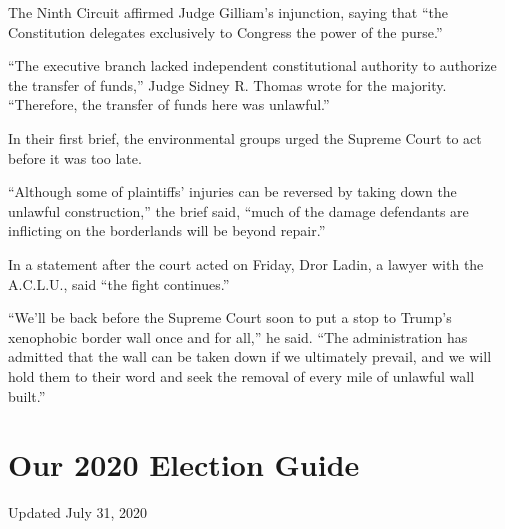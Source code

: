 The Ninth Circuit affirmed Judge Gilliam's injunction, saying that ``the
Constitution delegates exclusively to Congress the power of the purse.''

``The executive branch lacked independent constitutional authority to
authorize the transfer of funds,'' Judge Sidney R. Thomas wrote for the
majority. ``Therefore, the transfer of funds here was unlawful.''

In their first brief, the environmental groups urged the Supreme Court
to act before it was too late.

``Although some of plaintiffs' injuries can be reversed by taking down
the unlawful construction,'' the brief said, ``much of the damage
defendants are inflicting on the borderlands will be beyond repair.''

In a statement after the court acted on Friday, Dror Ladin, a lawyer
with the A.C.L.U., said ``the fight continues.''

``We'll be back before the Supreme Court soon to put a stop to Trump's
xenophobic border wall once and for all,'' he said. ``The administration
has admitted that the wall can be taken down if we ultimately prevail,
and we will hold them to their word and seek the removal of every mile
of unlawful wall built.''

\hypertarget{our-2020-election-guide}{%
\section{Our 2020 Election Guide}\label{our-2020-election-guide}}

Updated July 31, 2020


